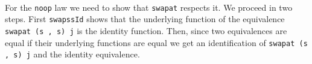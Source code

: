\begin{code}
\AgdaOperator{\AgdaFunction{]\%=\AgdaUnderscore{}}}\AgdaSymbol{)}\AgdaSpace{}%
\AgdaSpace{}%
\<%
\\
\>[8][@{}l@{\AgdaIndent{0}}]%
\>[10]\AgdaSpace{}%
\AgdaOperator{\AgdaFunction{[}}\AgdaSpace{}%
\AgdaSpace{}%
\AgdaOperator{\AgdaFunction{]\%=}}\AgdaSpace{}%
\<%
\\
%
\>[8]\AgdaSpace{}%
\AgdaSpace{}%
\AgdaSpace{}%
\AgdaSpace{}%
\<%
\\
%
\\[\AgdaEmptyExtraSkip]%
\>[0]\AgdaSpace{}%
\AgdaSymbol{:}\AgdaSpace{}%
\AgdaSymbol{(}\AgdaSpace{}%
\AgdaSpace{}%
\AgdaSymbol{)}\AgdaSpace{}%
\AgdaSpace{}%
\AgdaSpace{}%
\AgdaSpace{}%
\AgdaSpace{}%
\AgdaSpace{}%
\AgdaSpace{}%
\<%
\\
\>[0]\AgdaSpace{}%
\AgdaSymbol{(}\AgdaSpace{}%
\AgdaOperator{\AgdaInductiveConstructor{,}}\AgdaSpace{}%
\AgdaSymbol{)}\AgdaSpace{}%
\AgdaSpace{}%
\AgdaSymbol{=}\AgdaSpace{}%
\<%
\\
\>[0][@{}l@{\AgdaIndent{0}}]%
\>[2]\AgdaSymbol{(}\AgdaSpace{}%
\AgdaSymbol{(}\AgdaSpace{}%
\AgdaSpace{}%
\AgdaSpace{}%
\AgdaSymbol{)}\AgdaSpace{}%
\AgdaSymbol{(}\AgdaSpace{}%
\AgdaSpace{}%
\AgdaSpace{}%
\AgdaSymbol{)}\AgdaSpace{}%
\AgdaSymbol{(}\AgdaSpace{}%
\AgdaSpace{}%
\AgdaSpace{}%
\AgdaSymbol{)}\AgdaSpace{}%
\AgdaSymbol{(}\AgdaSpace{}%
\AgdaSpace{}%
\AgdaSpace{}%
\AgdaSymbol{))}\<%
\end{code}

For the \texttt{noop} law we need to show that \texttt{swapat} respects it.
We proceed in two steps. First \texttt{swapssId} shows that the underlying function of the equivalence
\texttt{swapat (s , s) j} is the identity function. Then, since two equivalences are equal if their
underlying functions are equal we get an identification of \texttt{swapat (s , s) j} and the identity equivalence.

